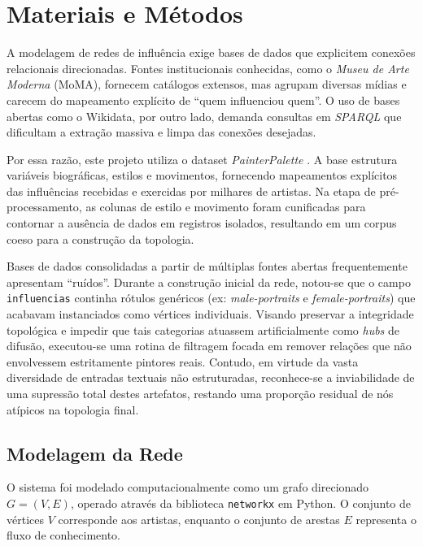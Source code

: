 \documentclass[12pt,a4paper]{article}
\begin{document}
\section{Materiais e Métodos}
\label{sec:materiais_metodos}

A modelagem de redes de influência exige bases de dados que explicitem conexões relacionais direcionadas. Fontes institucionais conhecidas, como o \textit{Museu de Arte Moderna} (MoMA), fornecem catálogos extensos, mas agrupam diversas mídias e carecem do mapeamento explícito de ``quem influenciou quem''. O uso de bases abertas como o Wikidata, por outro lado, demanda consultas em \textit{SPARQL} que dificultam a extração massiva e limpa das conexões desejadas.

Por essa razão, este projeto utiliza o dataset \textit{PainterPalette} \cite{painterpalette_ref}. A base estrutura variáveis biográficas, estilos e movimentos, fornecendo mapeamentos explícitos das influências recebidas e exercidas por milhares de artistas. Na etapa de pré-processamento, as colunas de estilo e movimento foram cunificadas para contornar a ausência de dados em registros isolados, resultando em um corpus coeso para a construção da topologia.

Bases de dados consolidadas a partir de múltiplas fontes abertas frequentemente apresentam ``ruídos''. Durante a construção inicial da rede, notou-se que o campo \texttt{influencias} continha rótulos genéricos (ex: \textit{male-portraits} e \textit{female-portraits}) que acabavam instanciados como vértices individuais. Visando preservar a integridade topológica e impedir que tais categorias atuassem artificialmente como \textit{hubs} de difusão, executou-se uma rotina de filtragem focada em remover relações que não envolvessem estritamente pintores reais. Contudo, em virtude da vasta diversidade de entradas textuais não estruturadas, reconhece-se a inviabilidade de uma supressão total destes artefatos, restando uma proporção residual de nós atípicos na topologia final.

\subsection{Modelagem da Rede}
\label{sec:modelagem}

O sistema foi modelado computacionalmente como um grafo direcionado $G = (V, E)$, operado através da biblioteca \texttt{networkx} em Python. O conjunto de vértices $V$ corresponde aos artistas, enquanto o conjunto de arestas $E$ representa o fluxo de conhecimento.
\end{document}

